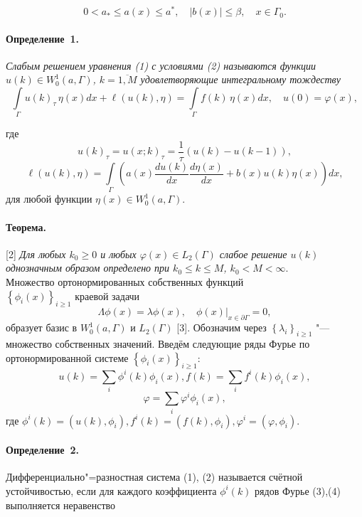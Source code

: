 \begin{equation*}{0<{{a}_{*}}\leqslant a(x)\leqslant{{a}^{*}},\quad|b(x)|\leqslant \beta,\quad x\in {{\Gamma }_{0}}.}\end{equation*} 

\paragraph{Определение~1.}  {\it Слабым решением   уравнения (1) с условиями (2) называются функции $ u(k)\in W_{0}^{1}(a,\Gamma ) $, $ k=\overline{1, M} $ удовлетворяющие интегральному тождеству} 
$$
	\int\limits_{\Gamma}u(k)_{\tau}\,\eta(x)dx+\ell(u(k),\eta)=
	\int\limits_{\Gamma}f(k)\,\eta(x) dx
	,\quad u(0)=\varphi(x) ,$$

 
где $$ u(k)_{\tau}=u(x;k)_{\tau}=\frac{1}{\tau}(u(k)-u(k-1)),$$
$$\ell(u(k),\eta)=\int\limits_{\Gamma}\left(a(x)\frac{d u(k)}{d x}\frac{d \eta(x)}{d x}+b(x)u(k)\eta(x)\right)dx,
$$
для любой функции $ \eta (x)\in W_{0}^{1}(a,\Gamma ) $.
\paragraph{Теорема.}[2] {\it Для любых $k_0\geqslant0$ и любых $\varphi(x)\in L_2(\Gamma)$ слабое решение $u(k)$ однозначным образом определено при $k_0\leqslant k\leqslant M$, $k_0<M<\infty$}.
\\

Множество ортонормированных собственных функций \\$\left\lbrace {\phi }_{i}(x) \right\rbrace_{i \geqslant 1}$ краевой задачи  $$\Lambda \phi(x) =\lambda \phi(x),\quad \phi(x){{|}_{x\in \partial \Gamma }}=0,$$ образует базис в $W_{0}^{1}(a,\Gamma )$ и ${{L}_{2}}(\Gamma )$  [3]. Обозначим через $\left\lbrace \lambda_{i}\right\rbrace_{i \geqslant 1}$ "--- множество собственных значений.
 Введём следующие ряды Фурье по ортонормированной системе  $\left\{\phi_{i}(x)\right\}_{i \geqslant 1}$:
\begin{equation}{
u(k)=\sum_{i}\phi^{i}(k) \phi_{i}(x), f(k)=\sum_{i} f^{i}(k) \phi_{i}(x)},\end{equation} 
\begin{equation}{
\varphi=\sum_{i} \varphi^{i} \phi_{i}(x),
}
\end{equation} 
где $\phi^{i}(k)=\left(u(k), \phi_{i}\right), f^{i}(k)=\left(f(k), \phi_{i}\right), \varphi^{i}=\left(\varphi, \phi_{i}\right)$.

\paragraph{Определение~2.}Дифференциально"=разностная система (1), (2) называется счётной устойчивостью, если для каждого коэффициента $\phi^{i}(k) $ рядов Фурье (3),(4) выполняется неравенство

